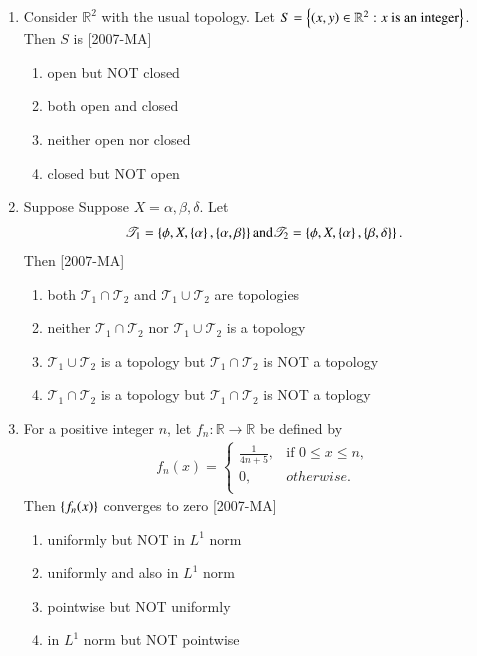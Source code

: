 \documentclass[journal]{IEEEtran}
\begin{document}
\begin{enumerate}
\item Consider $\mathbb R^2$ with the usual topology. Let $S=\left\{\left(x,y\right) \in \mathbb R^2:  x \text{ is an integer}\right\}$. Then $S$ is \hfill{[2007-MA]}
\begin{enumerate}
    \item open but NOT closed
    \item both open and closed
    \item neither open nor closed
    \item closed but NOT open
\end{enumerate}

\item Suppose Suppose $X = {\alpha, \beta, \delta}$. Let 
\begin{align*}
\mathscr{T}_1 = \left\{\phi, X, \left\{\alpha\right\}, \left\{\alpha, \beta\right\}\right\} \text{and} \mathscr{T}_2 = \left\{\phi, X, \left\{\alpha\right\}, \left\{\beta, \delta\right\}\right\}.
\end{align*}
Then \hfill{[2007-MA]}
\begin{enumerate}
    \item both $\mathscr{T}_1 \cap \mathscr{T}_2$ and $\mathscr{T}_1 \cup \mathscr{T}_2$ are topologies
    \item neither $\mathscr{T}_1 \cap \mathscr{T}_2$ nor $\mathscr{T}_1 \cup \mathscr{T}_2$ is a topology
    \item $\mathscr{T}_1 \cup \mathscr{T}_2$ is a topology but $\mathscr{T}_1 \cap \mathscr{T}_2$ is NOT a topology
    \item $\mathscr{T}_1 \cap \mathscr{T}_2$ is a topology but $\mathscr{T}_1 \cap \mathscr{T}_2$ is NOT a toplogy
\end{enumerate}

\item For a positive integer $n$, let $f_n:\mathbb R \rightarrow \mathbb R$ be defined by 
\begin{align*}
f_n(x)= \begin{cases} 
\frac{1}{4n+5}, & \text{if } 0 \leq x \leq n,\\
0, & otherwise. \\
\end{cases}
\end{align*}
Then $\left\{f_n(x)\right\}$ converges to zero \hfill{[2007-MA]}
\begin{enumerate}
    \item uniformly but NOT in $L^1$ norm
    \item uniformly and also in $L^1$ norm
    \item pointwise but NOT uniformly
    \item in $L^1$ norm but NOT pointwise
\end{enumerate}


\end{enumerate}
\end{document}
